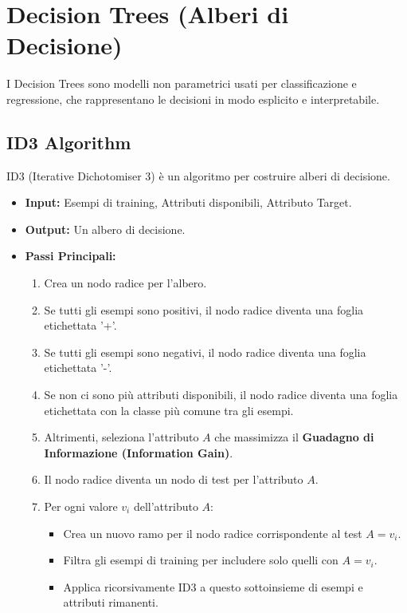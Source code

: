 \documentclass[a4paper,11pt]{article}
\begin{document}
\section{Decision Trees (Alberi di Decisione)}

I Decision Trees sono modelli non parametrici usati per classificazione e regressione, che rappresentano le decisioni in modo esplicito e interpretabile.

\subsection{ID3 Algorithm}
ID3 (Iterative Dichotomiser 3) è un algoritmo per costruire alberi di decisione.
\begin{itemize}
    \item \textbf{Input:} Esempi di training, Attributi disponibili, Attributo Target.
    \item \textbf{Output:} Un albero di decisione.
    \item \textbf{Passi Principali:}
    \begin{enumerate}
        \item Crea un nodo radice per l'albero.
        \item Se tutti gli esempi sono positivi, il nodo radice diventa una foglia etichettata '+'.
        \item Se tutti gli esempi sono negativi, il nodo radice diventa una foglia etichettata '-'.
        \item Se non ci sono più attributi disponibili, il nodo radice diventa una foglia etichettata con la classe più comune tra gli esempi.
        \item Altrimenti, seleziona l'attributo $A$ che massimizza il \textbf{Guadagno di Informazione (Information Gain)}.
        \item Il nodo radice diventa un nodo di test per l'attributo $A$.
        \item Per ogni valore $v_i$ dell'attributo $A$:
        \begin{itemize}
            \item Crea un nuovo ramo per il nodo radice corrispondente al test $A=v_i$.
            \item Filtra gli esempi di training per includere solo quelli con $A=v_i$.
            \item Applica ricorsivamente ID3 a questo sottoinsieme di esempi e attributi rimanenti.
        \end{itemize}
    \end{enumerate}
\end{itemize}
\end{document}
